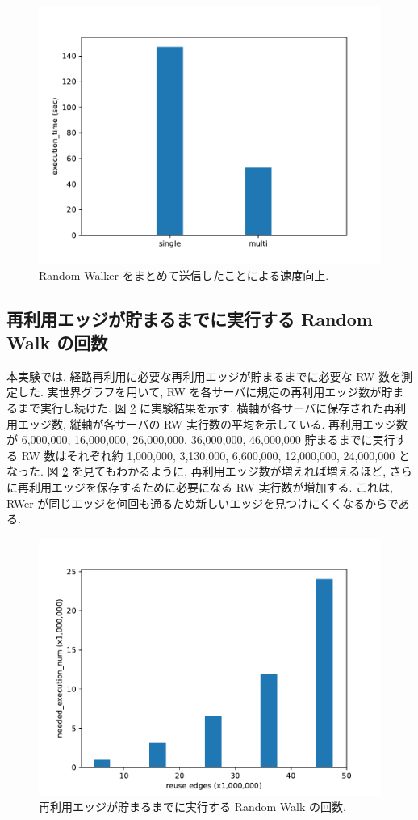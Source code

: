 \begin{figure}[t]
    \centering
    \includegraphics[scale=0.8]{figure/AR_send_num.pdf}
    \caption{Random Walker をまとめて送信したことによる速度向上.}
    \label{Random Walker の送信形態を変化させたときの実行時間}
\end{figure}

\subsection{再利用エッジが貯まるまでに実行する Random Walk の回数}\label{再利用エッジが貯まるまでに実行する Random Walk 実行数}

本実験では, 経路再利用に必要な再利用エッジが貯まるまでに必要な RW 数を測定した. 実世界グラフを用いて, RW を各サーバに規定の再利用エッジ数が貯まるまで実行し続けた. 図 \ref{再利用エッジが貯まるまでに実行する Random Walk の回数} に実験結果を示す. 横軸が各サーバに保存された再利用エッジ数, 縦軸が各サーバの RW 実行数の平均を示している. 再利用エッジ数が 6,000,000, 16,000,000, 26,000,000, 36,000,000, 46,000,000 貯まるまでに実行する RW 数はそれぞれ約 1,000,000, 3,130,000, 6,600,000, 12,000,000, 24,000,000 となった. 図 \ref{再利用エッジが貯まるまでに実行する Random Walk の回数} を見てもわかるように, 再利用エッジ数が増えれば増えるほど, さらに再利用エッジを保存するために必要になる RW 実行数が増加する. これは, RWer が同じエッジを何回も通るため新しいエッジを見つけにくくなるからである. 

\begin{figure}[t]
    \centering
    \includegraphics[scale=0.8]{figure/AR_cache_RWer_num.pdf}
    \caption{再利用エッジが貯まるまでに実行する Random Walk の回数.}
    \label{再利用エッジが貯まるまでに実行する Random Walk の回数}
\end{figure}